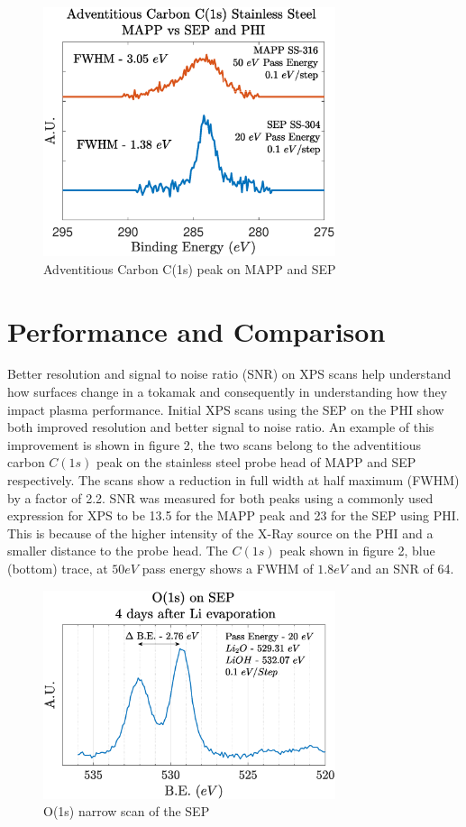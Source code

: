 \documentclass[aip,rsi,amsmath,amssymb,reprint]{revtex4-1}
\begin{document}
\begin{figure}%
\centering
\includegraphics[width=3.37in,keepaspectratio]{C1sMAPP_Comparr_20eV}%
\caption{Adventitious Carbon C(1s) peak on MAPP and SEP}
\end{figure}

\section{Performance and Comparison}

Better resolution and signal to noise ratio (SNR) on XPS scans help understand how surfaces change in a tokamak and consequently in understanding how they impact plasma performance. Initial XPS scans using the SEP on the PHI show both improved resolution and better signal to noise ratio. An example of this improvement is shown in figure 2, the two scans belong to the adventitious carbon $C(1s)$ peak on the stainless steel probe head of MAPP and SEP respectively. The scans show a reduction in full width at half maximum (FWHM) by a factor of 2.2. SNR was measured for both peaks using a commonly used expression for XPS \cite{xps_snr} to be 13.5 for the MAPP peak and 23 for the SEP using PHI. This is because of the higher intensity of the X-Ray source on the PHI and a smaller distance to the probe head. The $C(1s)$ peak shown in figure 2, blue (bottom) trace, at $50 eV$ pass energy shows a FWHM of $1.8eV$ and an SNR of 64. 

\begin{figure}%
\centering
\includegraphics[width=3.37in,keepaspectratio]{O1s_20eV}%
\caption{O(1s) narrow scan of the SEP }
\end{figure}
\end{document}
